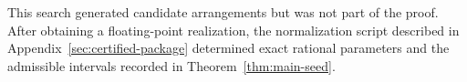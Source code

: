 This search generated candidate arrangements but was not part of the proof.
After obtaining a floating-point realization, the
normalization script described in Appendix~\ref{sec:certified-package}
determined exact rational parameters and the admissible intervals recorded in
Theorem~\ref{thm:main-seed}.
